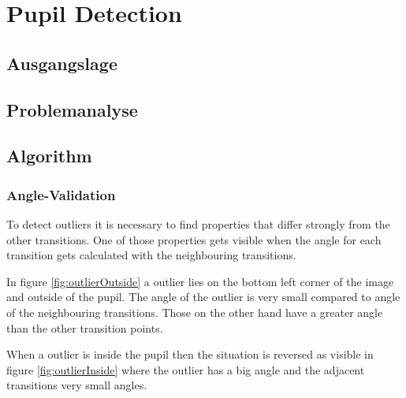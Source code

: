 \chapter{Pupil Detection}
\label{chap:pupildetection}
\section{Ausgangslage}
\label{sec:current}
\section{Problemanalyse}

\section{Algorithm}
\subsection{Angle-Validation}
\label{sec:angleValidation}
To detect outliers it is necessary to find properties that differ strongly from the other transitions. One of those properties gets visible when the angle for each transition gets calculated with the neighbouring transitions. 

In figure \ref{fig:outlierOutside} a outlier lies on the bottom left corner of the image and outside of the pupil. The angle of the outlier is very small compared to angle of the neighbouring transitions. Those on the other hand have a greater angle than the other transition points. 

When a outlier is inside the pupil then the situation is reversed as visible in figure \ref{fig:outlierInside} where the outlier has a big angle and the adjacent transitions very small angles. 

